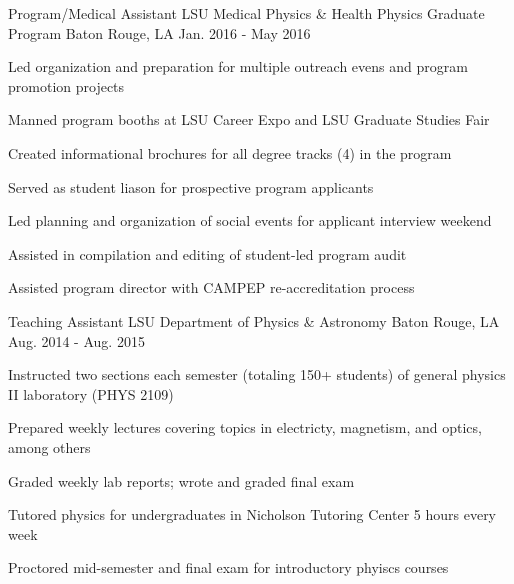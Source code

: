 \begin{cventries}
  \cventry
    {Program/Medical Assistant} %
    {LSU Medical Physics \& Health Physics Graduate Program} %
    {Baton Rouge, LA} %
    {Jan. 2016 - May 2016} %
    {
    \begin{cvitems} %
      \item {Led organization and preparation for multiple outreach evens and program promotion projects}
      \item {Manned program booths at LSU Career Expo and LSU Graduate Studies Fair}
      \item {Created informational brochures for all degree tracks (4) in the program}
      \item {Served as student liason for prospective program applicants}
      \item {Led planning and organization of social events for applicant interview weekend}
      \item {Assisted in compilation and editing of student-led program audit}
      \item {Assisted program director with CAMPEP re-accreditation process}
    \end{cvitems}
    }
    {}
\end{cventries}
\begin{cventries}
  \cventry
    {Teaching Assistant} %
    {LSU Department of Physics \& Astronomy} %
    {Baton Rouge, LA} %
    {Aug. 2014 - Aug. 2015} %
    {
    \begin{cvitems} %
      \item {Instructed two sections each semester (totaling 150+ students) of general physics II laboratory (PHYS 2109)}
      \item {Prepared weekly lectures covering topics in electricty, magnetism, and optics, among others}
      \item {Graded weekly lab reports; wrote and graded final exam}
      \item {Tutored physics for undergraduates in Nicholson Tutoring Center 5 hours every week}
      \item {Proctored mid-semester and final exam for introductory phyiscs courses}
    \end{cvitems}
    }
    {}
\end{cventries}
